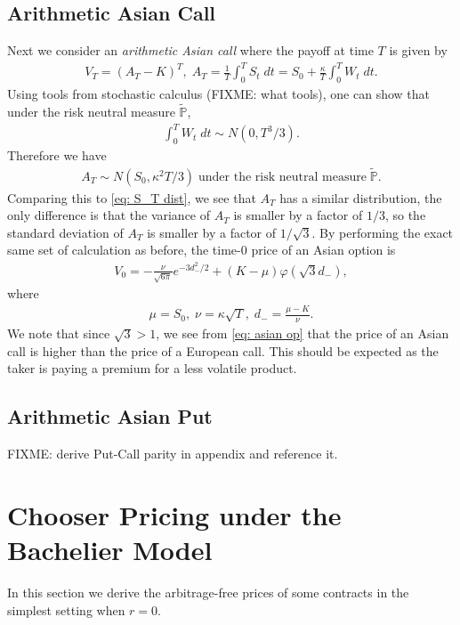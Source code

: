 \documentclass[reqno]{amsart}
\begin{document}
\subsection{Arithmetic Asian Call}
Next we consider an \emph{arithmetic Asian call} where the payoff at time $T$ is given by 
\begin{align} \label{eq: asian}
	 V_T = (A_T - K)^T, \; A_T = \frac{1}{T}\int_0^T S_t \; dt = S_0 + \frac{\kappa}{T} \int_0^T W_t \; dt. 
\end{align}
Using tools from stochastic calculus (FIXME: what tools), one can show that under the risk neutral measure $\tilde{\mathbb{P}}$, 
\begin{align}
	 \int_0^T W_t \; dt \sim N(0, T^3/3).
\end{align}
Therefore we have 
\begin{align}
	 A_T \sim N(S_0, \kappa^2 T/3) \; \text{under the risk neutral measure} \; \tilde{\mathbb{P}}.
\end{align}
Comparing this to \eqref{eq: S_T dist}, we see that $A_T$ has a similar distribution, the only difference is that the variance of $A_T$ is smaller by a factor of $1/3$, so the standard deviation of $A_T$ is smaller by a factor of $1/\sqrt{3}$. By performing the exact same set of calculation as before, the time-0 price of an Asian option is 
\begin{align} \label{eq: asian op}
	 V_0 = -\frac{\nu}{\sqrt{6\pi}} e^{-3d_-^2/2} + (K-\mu) \varphi(\sqrt{3}d_-),
\end{align}
where 
\begin{align}
	 \mu = S_0, \; \nu = \kappa \sqrt{T}, \; d_- = \frac{\mu - K}{\nu}.
\end{align}
We note that since $\sqrt{3} > 1$, we see from \eqref{eq: asian op} that the price of an Asian call is higher than the price of a European call. This should be expected as the taker is paying a premium for a less volatile product. 


\subsection{Arithmetic Asian Put}
FIXME: derive Put-Call parity in appendix and reference it.

\section{Chooser Pricing under the Bachelier Model}
In this section we derive the arbitrage-free prices of some contracts in the simplest setting when $r = 0$.  
\end{document}
